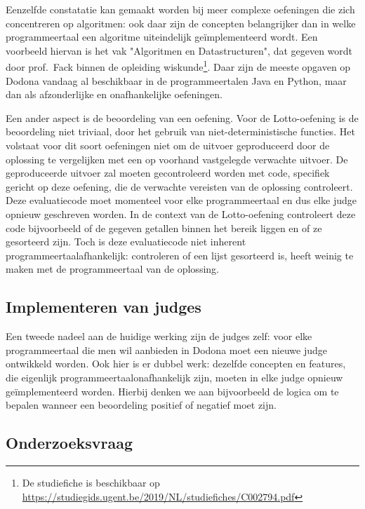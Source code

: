 Eenzelfde constatatie kan gemaakt worden bij meer complexe oefeningen die zich concentreren op algoritmen: ook daar zijn de concepten belangrijker dan in welke programmeertaal een algoritme uiteindelijk geïmplementeerd wordt.
Een voorbeeld hiervan is het vak "Algoritmen en Datastructuren", dat gegeven wordt door prof.\ Fack binnen de opleiding wiskunde\footnote{De studiefiche is beschikbaar op \url{https://studiegids.ugent.be/2019/NL/studiefiches/C002794.pdf}}.
Daar zijn de meeste opgaven op Dodona vandaag al beschikbaar in de programmeertalen Java en Python, maar dan als afzonderlijke en onafhankelijke oefeningen.

Een ander aspect is de beoordeling van een oefening.
Voor de Lotto-oefening is de beoordeling niet triviaal, door het gebruik van niet-deterministische functies.
Het volstaat voor dit soort oefeningen niet om de uitvoer geproduceerd door de oplossing te vergelijken met een op voorhand vastgelegde verwachte uitvoer.
De geproduceerde uitvoer zal moeten gecontroleerd worden met code, specifiek gericht op deze oefening, die de verwachte vereisten van de oplossing controleert.
Deze evaluatiecode moet momenteel voor elke programmeertaal en dus elke judge opnieuw geschreven worden.
In de context van de Lotto-oefening controleert deze code bijvoorbeeld of de gegeven getallen binnen het bereik liggen en of ze gesorteerd zijn.
Toch is deze evaluatiecode niet inherent programmeertaalafhankelijk: controleren of een lijst gesorteerd is, heeft weinig te maken met de programmeertaal van de oplossing.

\subsection{Implementeren van judges}\label{subsec:implementeren-van-judges}

Een tweede nadeel aan de huidige werking zijn de judges zelf: voor elke programmeertaal die men wil aanbieden in Dodona moet een nieuwe judge ontwikkeld worden.
Ook hier is er dubbel werk: dezelfde concepten en features, die eigenlijk programmeertaalonafhankelijk zijn, moeten in elke judge opnieuw geïmplementeerd worden.
Hierbij denken we aan bijvoorbeeld de logica om te bepalen wanneer een beoordeling positief of negatief moet zijn.

\subsection{Onderzoeksvraag}\label{subsec:onderzoeksvraag}

